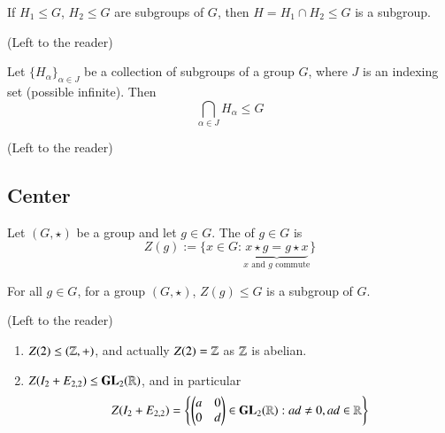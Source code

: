 \documentclass[12pt, a4paper, twoside, openright, titlepage]{book}
\begin{document}
\begin{prop}{}{}
    If $H_1 \leq G$, $H_2 \leq G$ are subgroups of $G$, then $H = H_1 \cap H_2 \leq G$ is a subgroup.
    \begin{proof*}{}{}
        (Left to the reader)
    \end{proof*}
\end{prop}

\begin{cor}{}{}
    Let $\{H_{\alpha}\}_{\alpha \in J}$ be a collection of subgroups of a group $G$, where $J$ is an indexing set (possible infinite). Then \begin{equation}
        \bigcap_{\alpha \in J}H_{\alpha} \leq G
    \end{equation}
    \begin{proof*}{}{}
        (Left to the reader)
    \end{proof*}
\end{cor}

\subsection{\textsection Center}

\begin{defn}{}{}
    Let $(G,\star)$ be a group and let $g \in G$. The  of $g \in G$ is \begin{equation}
        Z(g) := \{x \in G: \underbrace{x\star g = g \star x}_{x\text{ and }g\text{ commute}}\}
    \end{equation}
\end{defn}

\begin{claim}{}{}
    For all $g \in G$, for a group $(G,\star)$, $Z(g) \leq G$ is a subgroup of $G$.
    \begin{proof*}{}{}
        (Left to the reader)
    \end{proof*}
\end{claim}

\begin{eg}{}{}
    \leavevmode
    \begin{enumerate}
        \item $Z(2) \leq (\mathbb Z,+)$, and actually $Z(2) = \mathbb Z$ as $\mathbb Z$ is abelian.
        \item $Z(I_2 + E_{2,2}) \leq \mathbf{GL}_2(\mathbb R)$, and in particular $$Z(I_2+E_{2,2}) = \left\{\begin{pmatrix} a & 0 \\ 0 & d \end{pmatrix} \in \mathbf{GL}_2(\mathbb R):ad \neq 0, ad\in \mathbb R\right\}$$
    \end{enumerate}
\end{eg}
\end{document}
